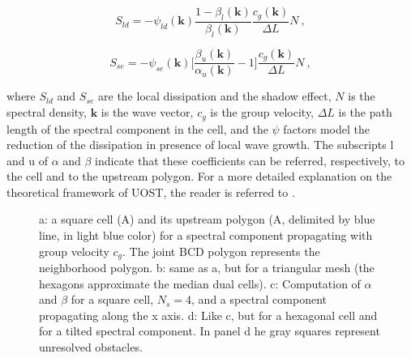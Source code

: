 \begin{equation}
S_{ld} = - \psi_{ld}(\mathbf{k}) \frac{1 - \beta_l(\mathbf{k})}{\beta_l(\mathbf{k})} \frac{c_g(\mathbf{k})}{\Delta L} N \ ,
\end{equation}

\begin{equation}
S_{se} = - \psi_{se}(\mathbf{k}) \bigg[ \frac{\beta_u(\mathbf{k})}{\alpha_u(\mathbf{k})} - 1 \bigg] \frac{c_g(\mathbf{k})}{\Delta L} N \ ,
\end{equation}

where $S_{ld}$ and $S_{se}$ are the local dissipation and the shadow effect,
$N$ is the spectral density, 
$\mathbf{k}$ is the wave vector, 
$c_g$ is the group velocity, $\Delta L$ is the path length of the spectral component 
in the cell, and the $\psi$ factors model the reduction of the dissipation in presence of
local wave growth. 
The subscripts l and u of $\alpha$ and $\beta$ indicate that these coefficients 
can be referred, respectively, to the cell and to the upstream polygon.
For a more detailed explanation on the theoretical framework of UOST, 
the reader is referred to
\citep{art:Mentaschi2015b, art:Mentaschi2018a}.


\begin{figure} \begin{center}
\caption{
a: a square cell (A) and its upstream polygon 
(A\textsc{}, delimited by blue line, in light blue color) for a spectral 
component propagating with group velocity $c_g$. 
The joint BCD polygon represents the neighborhood polygon. 
b: same as a, but for a triangular mesh (the hexagons approximate the median dual cells). 
c: Computation of $\alpha$ and $\beta$ for a square cell, $N_s=4$, 
and a spectral component propagating along the x axis. 
d: Like c, but for a hexagonal cell and for a tilted spectral component. 
In panel d he gray squares represent unresolved obstacles. 
}
\label{fig:UOST} \botline
\end{center}
\end{figure}


